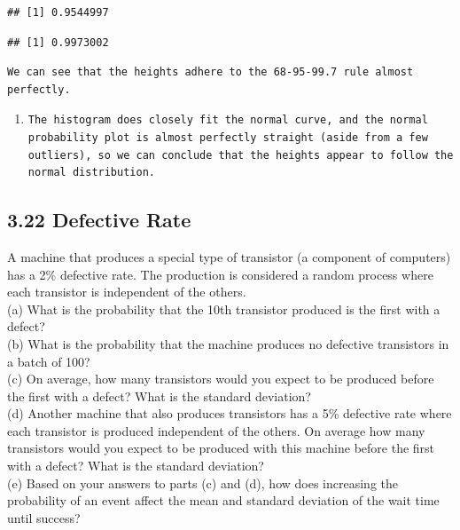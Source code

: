 \documentclass[]{article}
\newenvironment{Shaded}{\begin{snugshade}}{\end{snugshade}}
\newcommand{\KeywordTok}[1]{\textcolor[rgb]{0.13,0.29,0.53}{\textbf{{#1}}}}
\newcommand{\DecValTok}[1]{\textcolor[rgb]{0.00,0.00,0.81}{{#1}}}
\newcommand{\StringTok}[1]{\textcolor[rgb]{0.31,0.60,0.02}{{#1}}}
\newcommand{\CommentTok}[1]{\textcolor[rgb]{0.56,0.35,0.01}{\textit{{#1}}}}
\newcommand{\NormalTok}[1]{{#1}}
\begin{document}
\begin{verbatim}
## [1] 0.9544997
\end{verbatim}

\begin{Shaded}
\end{Shaded}

\begin{verbatim}
## [1] 0.9973002
\end{verbatim}

\begin{verbatim}
We can see that the heights adhere to the 68-95-99.7 rule almost perfectly.
\end{verbatim}

\begin{enumerate}
\def\labelenumi{(\alph{enumi})}
\setcounter{enumi}{1}
\item
\begin{verbatim}
The histogram does closely fit the normal curve, and the normal probability plot is almost perfectly straight (aside from a few outliers), so we can conclude that the heights appear to follow the normal distribution.
\end{verbatim}
\end{enumerate}

\subsection{3.22 Defective Rate}\label{defective-rate}

A machine that produces a special type of transistor (a component of
computers) has a 2\% defective rate. The production is considered a
random process where each transistor is independent of the others.\\
(a) What is the probability that the 10th transistor produced is the
first with a defect?\\
(b) What is the probability that the machine produces no defective
transistors in a batch of 100?\\
(c) On average, how many transistors would you expect to be produced
before the first with a defect? What is the standard deviation?\\
(d) Another machine that also produces transistors has a 5\% defective
rate where each transistor is produced independent of the others. On
average how many transistors would you expect to be produced with this
machine before the first with a defect? What is the standard
deviation?\\
(e) Based on your answers to parts (c) and (d), how does increasing the
probability of an event affect the mean and standard deviation of the
wait time until success?
\end{document}
